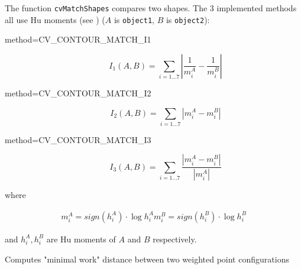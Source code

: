 \begin{description}
\end{description}

The function \texttt{cvMatchShapes} compares two shapes. The 3 implemented methods all use Hu moments (see ) ($A$ is \texttt{object1}, $B$ is \texttt{object2}):

\begin{description}
\item[method=CV\_CONTOUR\_MATCH\_I1]
\[ I_1(A,B) = \sum_{i=1...7} \left| \frac{1}{m^A_i} - \frac{1}{m^B_i} \right| \]

\item[method=CV\_CONTOUR\_MATCH\_I2]
\[ I_2(A,B) = \sum_{i=1...7} \left| m^A_i - m^B_i \right| \]

\item[method=CV\_CONTOUR\_MATCH\_I3]
\[ I_3(A,B) = \sum_{i=1...7} \frac{ \left| m^A_i - m^B_i \right| }{ \left| m^A_i \right| } \]
\end{description}

where

\[
\begin{array}{l}
m^A_i = sign(h^A_i) \cdot \log{h^A_i}
m^B_i = sign(h^B_i) \cdot \log{h^B_i}
\end{array}
\]

and $h^A_i, h^B_i$ are Hu moments of $A$ and $B$ respectively.

\label{CalcEMD2}

Computes "minimal work" distance between two weighted point configurations


